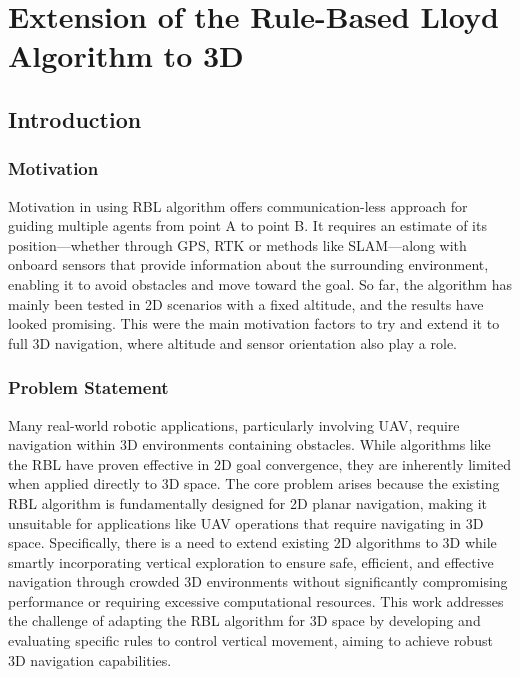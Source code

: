 \chapter{Extension of the Rule-Based Lloyd Algorithm to 3D\label{chap:rbl}}
\section{Introduction}
    \subsection{Motivation}
        Motivation in using \ac{RBL} algorithm offers communication-less approach for guiding multiple agents from point A to point B.
        It requires an estimate of its position—whether through \ac{GPS}, \ac{RTK} or methods like \ac{SLAM}—along with onboard sensors that provide information about the surrounding environment, enabling it to avoid obstacles and move toward the goal.
        So far, the algorithm has mainly been tested in 2D scenarios with a fixed altitude, and the results have looked promising. 
        This were the main motivation factors to try and extend it to full 3D navigation, where altitude and sensor orientation also play a role.

    \subsection{Problem Statement}
        Many real-world robotic applications, particularly involving \ac{UAV}, require navigation within 3D environments containing obstacles. 
        While algorithms like the \ac{RBL} \cite{rbl_paper} have proven effective in 2D goal convergence, they are inherently limited when applied directly to 3D space. 
        The core problem arises because the existing \ac{RBL} algorithm is fundamentally designed for 2D planar navigation, making it unsuitable for applications like UAV operations that require navigating in 3D space.
        Specifically, there is a need to extend existing 2D algorithms to 3D while smartly incorporating vertical exploration to ensure safe, efficient, and effective navigation through crowded 3D environments without significantly compromising performance or requiring excessive computational resources. 
        This work addresses the challenge of adapting the \ac{RBL} algorithm for 3D space by developing and evaluating specific rules to control vertical movement, aiming to achieve robust 3D navigation capabilities.
        
